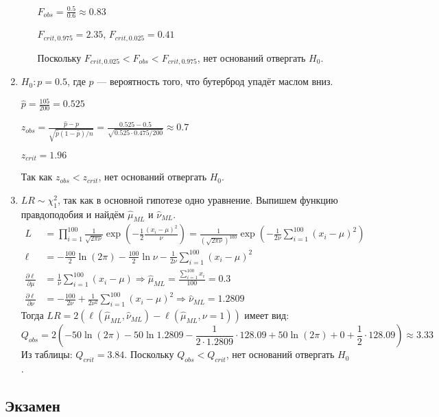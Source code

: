 \begin{enumerate}
\begin{enumerate}
$F_{obs} = \frac{0.5}{0.6} \approx 0.83$

$F_{crit, 0.975} = 2.35$, $F_{crit, 0.025} = 0.41$

Поскольку $F_{crit, 0.025} < F_{obs} < F_{crit, 0.975}$, нет оснований отвергать $H_0$.
\end{enumerate}
\item $H_0: p = 0.5$, где $p$ — вероятность того, что бутерброд упадёт маслом вниз.

$\hat{p} = \frac{105}{200} = 0.525$

$z_{obs} = \frac{\hat p - p}{\sqrt{\hat p (1 - \hat p)/n}} = \frac{0.525-0.5}{\sqrt{0.525\cdot0.475/200}} \approx 0.7$

$z_{crit} = 1.96$

Так как $z_{obs} < z_{crit}$, нет оснований отвергать $H_0$.
\item $LR \sim \chi^2_1$, так как в основной гипотезе одно уравнение.
Выпишем функцию правдоподобия и найдём $\hat{\mu}_{ML}$ и $\hat{\nu}_{ML}$.
\begin{align*}
L &= \prod_{i=1}^{100} \frac{1}{\sqrt{2\pi\nu}} \exp\left(-\frac{1}{2} \frac{(x_i-\mu)^2}{\nu} \right) = \frac{1}{(\sqrt{2\pi\nu})^{100}} \exp \left(-\frac{1}{2\nu}\sum_{i=1}^{100} (x_i - \mu)^2 \right) \\
\ell &= -\frac{100}{2}\ln (2\pi) - \frac{100}{2} \ln \nu - \frac{1}{2\nu}\sum_{i=1}^{100} (x_i - \mu)^2 \\
\frac{\partial \ell}{\partial \mu} &= \frac{1}{\nu} \sum_{i=1}^{100} (x_i - \mu) \Rightarrow \hat{\mu}_{ML} = \frac{\sum_{i=1}^{100} x_i}{100} = 0.3 \\
\frac{\partial \ell}{\partial \nu} &= -\frac{100}{2\nu} + \frac{1}{2\nu^2}\sum_{i=1}^{100} (x_i - \mu)^2 \Rightarrow \hat{\nu}_{ML} = 1.2809
\end{align*}
Тогда $LR=2(\ell(\hat{\mu}_{ML}, \hat{\nu}_{ML}) - \ell(\hat{\mu}_{ML}, \nu = 1))$ имеет вид:
\[
Q_{obs}= 2 \left(-50 \ln(2\pi) - 50 \ln 1.2809 - \frac{1}{2\cdot1.2809}\cdot 128.09 + 50 \ln(2\pi) + 0 + \frac{1}{2} \cdot 128.09 \right) \approx 3.33
\]
Из таблицы: $Q_{crit} = 3.84$. Поскольку $Q_{obs} < Q_{crit}$, нет оснований отвергать $H_0$.
\end{enumerate}



\subsection{Экзамен}



